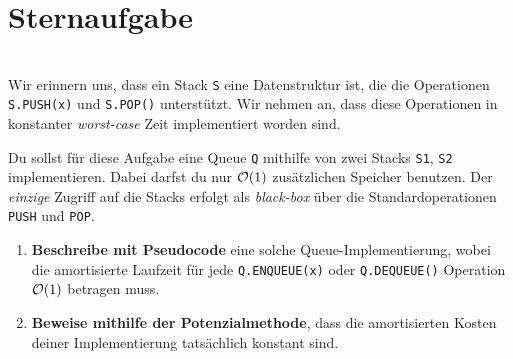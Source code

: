 \documentclass{uebung_cs}
\begin{document}
\section*{Sternaufgabe}

\begin{aufgabe}\mbox{}\\
	Wir erinnern uns, dass ein Stack \texttt{S} eine Datenstruktur ist, die die Operationen \texttt{S.PUSH(x)} und \texttt{S.POP()} unterstützt. Wir nehmen an, dass diese Operationen in konstanter \emph{worst-case} Zeit implementiert worden sind.

	Du sollst für diese Aufgabe eine Queue \texttt{Q} mithilfe von zwei Stacks \texttt{S1}, \texttt{S2} implementieren. Dabei darfst du nur $\mathcal{O}(1)$ zusätzlichen Speicher benutzen.
	Der \textit{einzige} Zugriff auf die Stacks erfolgt als \emph{black-box} über die Standardoperationen \texttt{PUSH} und \texttt{POP}.
	\begin{enumerate}
		\item 
		\textbf{Beschreibe mit Pseudocode} eine solche Queue-Implementierung, wobei die amortisierte Laufzeit für jede \texttt{Q.ENQUEUE(x)} oder \texttt{Q.DEQUEUE()} Operation $\mathcal{O}(1)$ betragen muss.
		\item
		\textbf{Beweise mithilfe der Potenzialmethode}, dass die amortisierten Kosten deiner Implementierung tatsächlich konstant sind.
	\end{enumerate}
\end{aufgabe}
\end{document}
